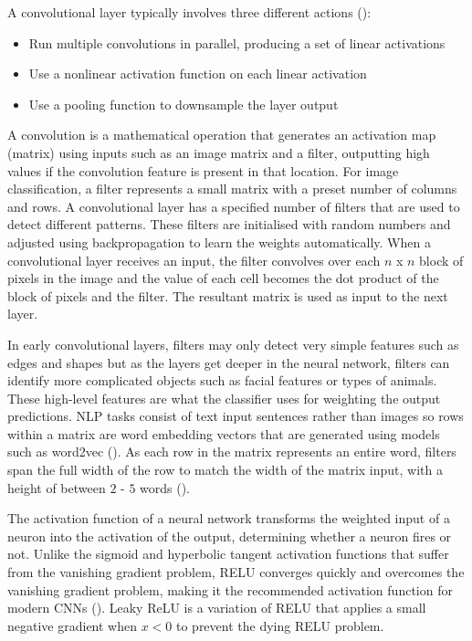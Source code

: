 A convolutional layer typically involves three different actions (\cite{goodfellow_deep_learning_2016}):
\begin{itemize}
    \item Run multiple convolutions in parallel, producing a set of linear activations
    \item Use a nonlinear activation function on each linear activation
    \item Use a pooling function to downsample the layer output
\end{itemize}


A convolution is a mathematical operation that generates an activation map (matrix) using inputs such as an image matrix and a filter, outputting high values if the convolution feature is present in that location. For image classification, a filter represents a small matrix with a preset number of columns and rows.
A convolutional layer has a specified number of filters that are used to detect different patterns. These filters are initialised with random numbers and adjusted using backpropagation to learn the weights automatically.
When a convolutional layer receives an input, the filter convolves over each $n$ x $n$ block of pixels in the image and the value of each cell becomes the dot product of the block of pixels and the filter. The resultant matrix is used as input to the next layer.

In early convolutional layers, filters may only detect very simple features such as edges and shapes but as the layers get deeper in the neural network, filters can identify more complicated objects such as facial features or types of animals. These high-level features are what the classifier uses for weighting the output predictions.
\acrshort{NLP} tasks consist of text input sentences rather than images so rows within a matrix are word embedding vectors that are generated using models such as word2vec (\cite{mikolov_word2vec_2013}). 
As each row in the matrix represents an entire word, filters span the full width of the row to match the width of the matrix input, with a height of between $2$ - $5$ words (\cite{lopez_deep_2017}).

The activation function of a neural network transforms the weighted input of a neuron into the activation of the output, determining whether a neuron fires or not. Unlike the sigmoid and hyperbolic tangent activation functions that suffer from the vanishing gradient problem, \acrfull{RELU} converges quickly and overcomes the vanishing gradient problem, making it the recommended activation function for modern \acrshort{CNN}s (\cite{nair_rectified_2010}). 
Leaky ReLU is a variation of \acrshort{RELU} that applies a small negative gradient when $x < 0$ to prevent the dying \acrshort{RELU} problem.

